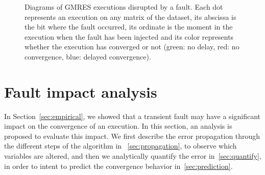 \documentclass[twoside]{article}
\newcounter{fig}\setcounter{fig}{0}
\begin{document}
\begin{figure}[ht]
    \caption{Diagrams of GMRES executions disrupted by a fault. Each dot represents an execution on any matrix of the dataset, its abscissa is the bit where the fault occurred, its ordinate is the moment in the execution when the fault has been injected and its color represents whether the execution has converged or not (green: no delay, red: no convergence, blue: delayed convergence).}
    \label{fig:matrices_bit_iteration}
  \end{figure}








  \newpage


  \section{Fault impact analysis}
  In Section~\ref{sec:empirical}, we showed that a transient fault may have a significant impact on the convergence of an execution. In this section, an analysis is proposed to evaluate this impact. We first describe the error propagation through the different steps of the algorithm in ~\ref{sec:propagation}, to observe which variables are altered, and then we analytically quantify the error in~\ref{sec:quantify}, in order to intent to predict the convergence behavior in~\ref{sec:prediction}.
\end{document}
